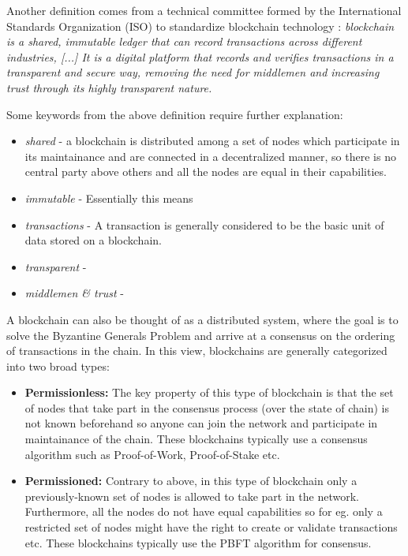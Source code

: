 Another definition comes from a technical committee formed by the International Standards Organization (ISO) to standardize blockchain technology \cite{isotc307}:
\textit{
    blockchain is a shared, immutable ledger that can record transactions across different industries, [...] 
    It is a digital platform that records and verifies transactions in a transparent and secure way, removing the need for middlemen and increasing trust through its highly transparent nature.
} 

Some keywords from the above definition require further explanation: 

\begin{itemize}
    \item \textit{shared} - a blockchain is distributed among a set of nodes which participate in its maintainance and are connected in a decentralized manner, so  there is no central party above others and all the nodes are equal in their capabilities.

    \item \textit{immutable} - Essentially this means

    \item \textit{transactions}  - A transaction is generally considered to be the basic unit of data stored on a blockchain.

    \item \textit{transparent} - 

    \item \textit{middlemen \& trust} - 
\end{itemize}

A blockchain can also be thought of as a distributed system, where the goal is to solve the Byzantine Generals Problem and arrive at a consensus on the ordering of transactions in the chain. In this view, blockchains are generally categorized into two broad types: 

\begin{itemize}
    \item \textbf{Permissionless: } The key property of this type of blockchain is that the set of nodes that take part in the consensus process (over the state of chain) is not known beforehand so anyone can join the network and participate in maintainance of the chain. These blockchains typically use a consensus algorithm such as Proof-of-Work, Proof-of-Stake etc.
    
    \item \textbf{Permissioned: } Contrary to above, in this type of blockchain only a previously-known set of nodes is allowed to take part in the network. Furthermore, all the nodes do not have equal capabilities so for eg. only a restricted set of nodes might have the right to create or validate transactions etc. These blockchains typically use the PBFT algorithm for consensus.
\end{itemize}


